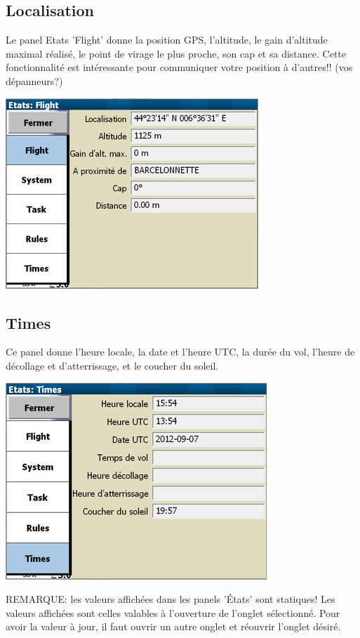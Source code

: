 \subsection*{Localisation}
Le panel Etats 'Flight' donne la position GPS, l'altitude, le gain d'altitude maximal réalisé, le point de virage le plus proche, son cap et sa distance. Cette fonctionnalité est intéressante pour communiquer votre position à d'autres!! (vos dépanneurs?)
\begin{center}
\includegraphics[angle=0,width=0.7\linewidth,keepaspectratio='true']{figures/status-flight.png}
\end{center}

\subsection*{Times}
Ce panel donne l'heure locale, la date et l'heure UTC, la durée du vol, l'heure de décollage et d'atterrissage, et le coucher du soleil.
\begin{center}
\includegraphics[angle=0,width=0.7\linewidth,keepaspectratio='true']{figures/status-times.png}
\end{center}
REMARQUE: les valeurs affichées dans les panels 'États' sont statiques! Les valeurs affichées sont celles valables à l'ouverture de l'onglet sélectionné. Pour avoir la valeur à jour, il faut ouvrir un autre onglet et réouvrir l'onglet désiré. 

